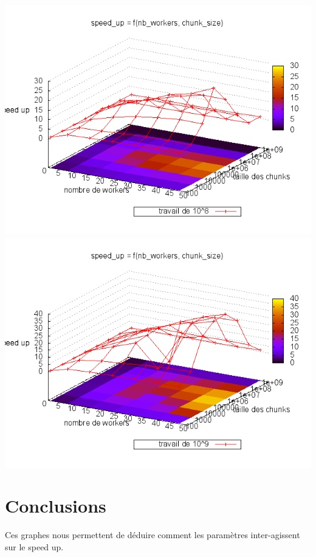 \documentclass[oneside,10pt]{article}
\begin{document}
\includegraphics[scale=0.5]{travail_100000000.png}
\includegraphics[scale=0.5]{travail_1000000000.png}

\section{Conclusions}
Ces graphes nous permettent de d\'eduire comment les param\`etres inter-agissent sur le speed up.
\end{document}
